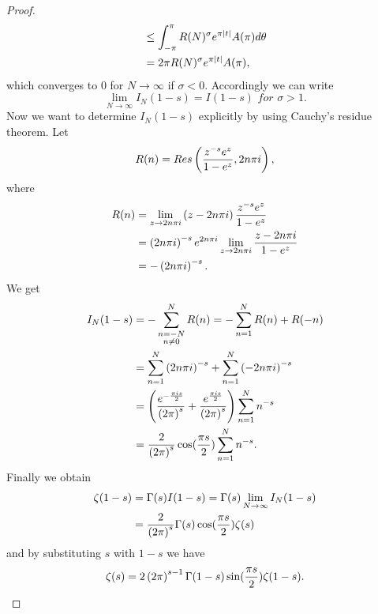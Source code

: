 \begin{proof}
\begin{equation*}
\begin{aligned}
	&\leq \int_{-\pi}^{\pi} R(N)^\sigma e^{\pi \left|t\right|} A(\pi) d\theta \\
	&= 2 \pi R(N)^\sigma e^{\pi \left|t\right|} A(\pi),
\end{aligned}
\end{equation*}
	which converges to $0$ for $N \to \infty$ if $\sigma < 0$. Accordingly we can write
\begin{equation*}
	\lim\limits_{N \to \infty} I_N(1 - s) = I(1 - s) \textit{ for } \sigma > 1.
\end{equation*}
	Now we want to determine $I_N(1 - s)$ explicitly by using Cauchy's residue theorem. Let
\begin{equation*}
	R(n) = Res\left(\frac{z^{-s} e^z}{1 - e^z}, 2 n \pi i\right),
\end{equation*}
	where
\begin{equation*}
\begin{aligned}
	R(n) &= \lim\limits_{z \to 2 n \pi i} \left(z - 2 n \pi i\right) \frac{z^{-s} e^z}{1 - e^z} \\
	&= \left(2 n \pi i\right)^{-s} e^{2 n \pi i} \lim\limits_{z \to 2 n \pi i} \frac{z - 2 n \pi i}{1 - e^z} \\
	&= - \left(2 n \pi i\right)^{-s}.
\end{aligned} 
\end{equation*}
	We get
\begin{equation*}
\begin{aligned}	
	I_N(1 - s)
	&= - \sum _{\substack{n = -N \\ n \neq 0}} ^N R(n) = - \sum _{n = 1} ^N R(n) + R(-n) \\
	&= \sum _{n = 1} ^N \left(2 n \pi i\right)^{-s} + \sum _{n = 1} ^N \left(-2 n \pi i\right)^{-s} \\
	&= \left(\frac{e^{-\frac{\pi i s}{2}}}{\left(2 \pi\right)^s} + \frac{e^{\frac{\pi i s}{2}}}{\left(2 \pi\right)^s}\right) \sum _{n = 1} ^N n^{-s} \\
	&= \frac{2}{\left(2 \pi\right)^s} \cos(\frac{\pi s}{2}) \sum _{n = 1} ^N n^{-s}.
\end{aligned}
\end{equation*}
	Finally we obtain
\begin{equation*}
\begin{aligned}
	\zeta(1 - s) &= \Gamma(s) I(1 - s) = \Gamma(s) \lim\limits_{N \to \infty} I_N(1 - s) \\
	&= \frac{2}{\left(2 \pi\right)^s} \Gamma(s) \cos(\frac{\pi s}{2}) \zeta(s)
\end{aligned}
\end{equation*}
	and by substituting $s$ with $1 - s$ we have
\begin{equation*}
	\zeta(s) = 2\left(2 \pi\right)^{s - 1} \Gamma(1 - s) \sin(\frac{\pi s}{2}) \zeta(1 - s).
\end{equation*}
\end{proof}


